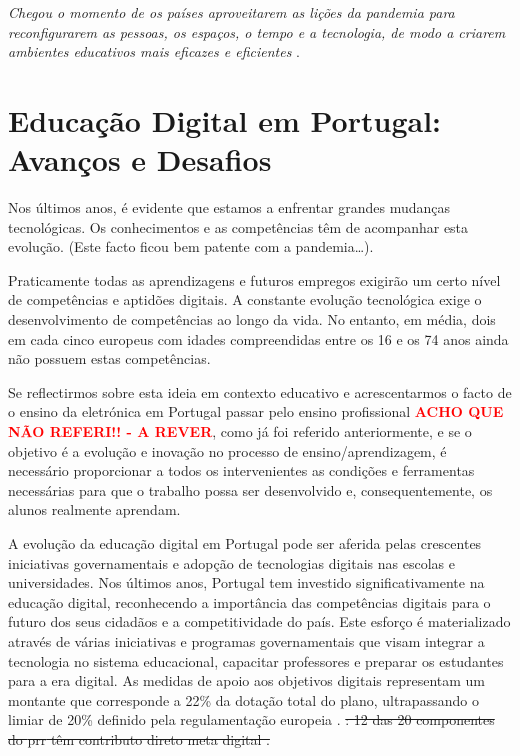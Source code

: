 \begin{center}
{\textit{Chegou o momento de os países aproveitarem as lições da pandemia para reconfigurarem as pessoas, os espaços, o tempo e a tecnologia, de modo a criarem ambientes educativos mais eficazes e eficientes}} \cite{thestateofeducation}.   
\end{center}

\section{Educação Digital em Portugal: Avanços e Desafios}
\label{sec:educacaodigital}	%

Nos últimos anos, é evidente que estamos a enfrentar grandes mudanças tecnológicas. Os conhecimentos e as competências têm de acompanhar esta evolução. (Este facto ficou bem patente com a pandemia\ldots).

Praticamente todas as aprendizagens e futuros empregos exigirão um certo nível de competências e aptidões digitais. A constante evolução tecnológica exige o desenvolvimento de competências ao longo da vida\cite{Digitale13:online}.
No entanto, em média, dois em cada cinco europeus com idades compreendidas entre os 16 e os 74 anos ainda não possuem estas competências\cite{DESI2020}.

Se reflectirmos sobre esta ideia em contexto educativo e acrescentarmos o facto de o ensino da eletrónica em Portugal passar pelo ensino profissional \textbf{\textcolor{red}{ACHO QUE NÃO REFERI!! - A REVER}}, como já foi referido anteriormente, e se o objetivo é a evolução e inovação no processo de ensino/aprendizagem, é necessário proporcionar a todos os intervenientes as condições e ferramentas necessárias para que o trabalho possa ser desenvolvido e, consequentemente, os alunos realmente aprendam. 

A evolução da educação digital em Portugal pode ser aferida pelas crescentes iniciativas governamentais e adopção de tecnologias digitais nas escolas e universidades. Nos últimos anos, Portugal tem investido significativamente na educação digital, reconhecendo a importância das competências digitais para o futuro dos seus cidadãos e a competitividade do país. Este esforço é materializado através de várias iniciativas e programas governamentais que visam integrar a tecnologia no sistema educacional, capacitar professores e preparar os estudantes para a era digital. As medidas de apoio aos objetivos digitais representam um montante que corresponde a 22\% da dotação total do plano, ultrapassando o limiar de 20\% definido pela regulamentação europeia \cite{Transicaodigitalprr}. \sout{: 12 das 20 componentes do \acrshort{prr} têm contributo direto meta digital .}

